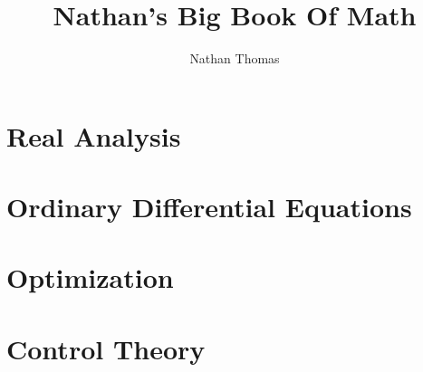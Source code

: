 \documentclass[12pt]{book}
\title{Nathan's Big Book Of Math}
\author{Nathan Thomas}
\begin{document}
\maketitle
\tableofcontents

\part{Real Analysis}
    
    
\part{Ordinary Differential Equations}
    
    
\part{Optimization}

\part{Control Theory}



\begin{appendix}
	\listoffigures
	\listoftables
\end{appendix}
	
\end{document}
